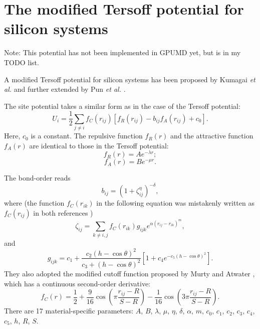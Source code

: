 \documentclass[12pt,a4paper]{report}
\begin{document}
\section{The modified Tersoff potential for silicon systems}

Note: This potential has not been implemented in GPUMD yet, but is in my TODO list.

A modified Tersoff potential for silicon systems has been proposed by Kumagai \textit{et al.} \cite{kumagai2007cms} and further extended by Pun \textit{et al.} \cite{pun2017prb}.

The site potential takes a similar form as in the case of the Tersoff potential:
\begin{equation}
U_i =  \frac{1}{2} \sum_{j \neq i} f_C(r_{ij}) \left[ f_R(r_{ij}) - b_{ij} f_A(r_{ij}) + c_0\right].
\end{equation}
Here, $c_0$ is a constant. The repulsive function $f_{R}(r)$ and the attractive function $f_{A}(r)$ are identical to those in the Tersoff potential:
\begin{equation}
f_{R}(r) = A e^{-\lambda r};
\end{equation}
\begin{equation}
f_{A}(r) = B e^{-\mu r}.
\end{equation}

The bond-order reads
\begin{equation}
b_{ij} = \left(1 + \zeta_{ij}^{\eta}\right)^{-\delta},
\end{equation}
where (the function $f_C(r_{ik})$ in the following equation was mistakenly written as $f_C(r_{ij})$ in both references \cite{kumagai2007cms,pun2017prb})
\begin{equation}
\zeta_{ij} = \sum_{k\neq i, j}f_C(r_{ik}) g_{ijk} e^{\alpha (r_{ij} - r_{ik})^m},
\end{equation}
and
\begin{equation}
g_{ijk} = c_1 + \frac{c_2(h-\cos\theta)^2}{c_3+(h-\cos\theta)^2}
                \left[1+c_4e^{-c_5(h-\cos\theta)^2}\right].
\end{equation}
They also adopted the modified cutoff function proposed by
Murty and Atwater \cite{murty1995prb}, which has a continuous second-order derivative:
\begin{equation}
f_{C}(r) = \frac{1}{2} +
\frac{9}{16} \cos \left( \pi \frac{r_{ij} - R}{S - R} \right) -
\frac{1}{16} \cos \left( 3\pi \frac{r_{ij} - R}{S - R} \right).
\end{equation}
There are 17 material-specific parameters: $A$, $B$, $\lambda$, $\mu$, $\eta$, $\delta$, $\alpha$, $m$, $c_0$, $c_1$, $c_2$, $c_3$, $c_4$, $c_5$, $h$, $R$, $S$.
\end{document}
